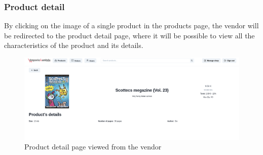 \subsubsection{Product detail}
By clicking on the image of a single product in the products page, the vendor will be redirected to the product detail page, where it will be possible to view all the characteristics of the product and its details.
\begin{figure}[!ht]
    \caption{Product detail page viewed from the vendor}
    \vspace{5px}
    \includegraphics[scale=0.35]{../../../../Images/userManual/productDetailVendor.png}
    \centering
\end{figure}


